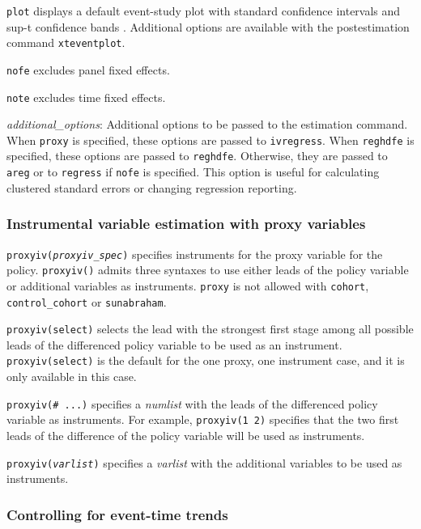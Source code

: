 \documentclass[12pt]{article}
\begin{document}
\hangpara
{\tt plot} displays a default event-study plot with standard confidence intervals and sup-t confidence bands \mbox{\citep{montiel2019simultaneous}}.
Additional options are available with the postestimation command {\tt xteventplot}.

\hangpara
{\tt nofe} excludes panel fixed effects.

\hangpara
{\tt note} excludes time fixed effects.

\hangpara
{\it additional\_options}: Additional options to be passed to the estimation command.
When {\tt proxy} is specified, these options are passed to {\tt ivregress}.
When {\tt reghdfe} is specified, these options are passed to {\tt reghdfe}.
Otherwise, they are passed to {\tt areg} or to {\tt regress} if {\tt nofe} is specified.
This option is useful for calculating clustered standard errors or changing regression reporting.

\subsubsection{Instrumental variable estimation with proxy variables \citep{freyaldenhoven2021visualizationforth}}

\hangpara
{\tt proxyiv({\it proxyiv\_spec})} specifies instruments for the proxy variable for the policy.
{\tt proxyiv()} admits three syntaxes to use either leads of the policy variable or additional variables as instruments.
{\tt proxy} is not allowed with {\tt cohort},
{\tt control\_cohort} or {\tt sunabraham}.

\morehangpara
{\tt proxyiv(select)} selects the lead with the strongest first stage among all possible leads of the differenced policy variable to be used as an instrument.
{\tt proxyiv(select)} is the default for the one proxy, one instrument case, and it is only available in this case.

\morehangpara
{\tt proxyiv(\# ...)} specifies a \textit{numlist} with the leads of the differenced policy variable as instruments. For example, {\tt proxyiv(1 2)} specifies that the two first leads of the difference of the policy variable will be used as instruments.

\morehangpara
{\tt proxyiv({\it varlist})} specifies a \textit{varlist} with the additional variables to be used as instruments.

\subsubsection{Controlling for event-time trends}
\end{document}
